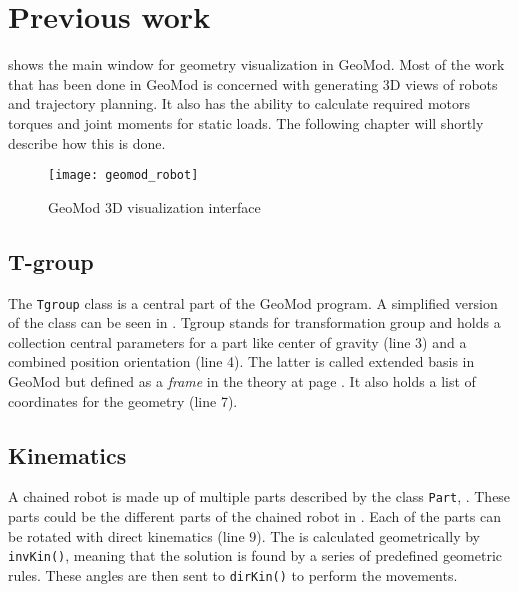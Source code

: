 \chapter{Previous work}\label{previous_work}

 shows the main window for geometry visualization in GeoMod. Most of the work that has been done in GeoMod is concerned with generating 3D views of robots and trajectory planning. It also has the ability to calculate required motors torques and joint moments for static loads. The following chapter will shortly describe how this is done. 

\begin{figure}
 \centering 
 \texttt{[image: geomod\_robot]}
 \caption{GeoMod 3D visualization interface}
 \label{geomod_interface}
\end{figure}

\section{T-group}


The \texttt{Tgroup} class is a central part of the GeoMod program. A simplified version of the class can be seen in . Tgroup stands for transformation group and holds a collection central parameters for a part like center of gravity (line 3) and a combined position orientation (line 4). The latter is called extended basis in GeoMod but defined as a \textit{frame} in the theory at page \pageref{secTheory}. It also holds a list of coordinates for the geometry (line 7).

\label{Tgroup}


\section{Kinematics}


A chained robot is made up of multiple parts described by the class \texttt{Part}, . These parts could be the different parts of the chained robot in . Each of the parts can be rotated with direct kinematics (line 9). The  is calculated geometrically by \texttt{invKin()}, meaning that the solution is found by a series of predefined geometric rules. These angles are then sent to \texttt{dirKin()} to perform the  movements.

